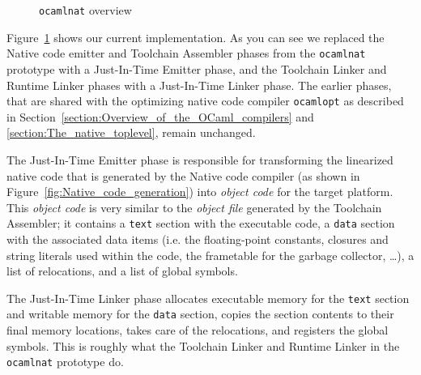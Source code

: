 \documentclass[10pt,a4paper,draft,twocolumn]{article}
\makeatletter
\newcommand{\ie}{i.e.\@\xspace}
\makeatother
\begin{document}
\begin{figure}[htb]
  \centering
  \caption{\texttt{ocamlnat} overview}
  \label{fig:ocamlnat_overview}
\end{figure}

Figure~\ref{fig:ocamlnat_overview} shows our current implementation. As you can see we replaced
the Native code emitter and Toolchain Assembler phases from the \texttt{ocamlnat} prototype with
a Just-In-Time Emitter phase, and the Toolchain Linker and Runtime Linker phases with a Just-In-Time
Linker phase. The earlier phases, that are shared with the optimizing native code compiler
\texttt{ocamlopt} as described in Section~\ref{section:Overview_of_the_OCaml_compilers} and
\ref{section:The_native_toplevel}, remain unchanged.

The Just-In-Time Emitter phase is responsible for transforming the linearized native code that is
generated by the Native code compiler (as shown in Figure~\ref{fig:Native_code_generation}) into
\emph{object code} for the target platform. This \emph{object code} is very similar to the \emph{object
file} generated by the Toolchain Assembler; it contains a \texttt{text} section with the executable
code, a \texttt{data} section with the associated data items (\ie the floating-point constants, closures
and string literals used within the code, the frametable for the garbage collector, \ldots), a list
of relocations, and a list of global symbols.

The Just-In-Time Linker phase allocates executable memory for the \texttt{text} section and writable
memory for the \texttt{data} section, copies the section contents to their final memory locations,
takes care of the relocations, and registers the global symbols. This is roughly what the Toolchain
Linker and Runtime Linker in the \texttt{ocamlnat} prototype do.
\end{document}
